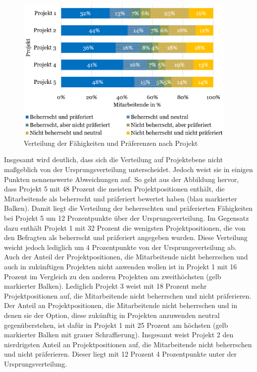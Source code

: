 \begin{figure}
    \centering
	\includegraphics[width=0.95\textwidth]{gfx/verteilung-f-p-nach-projekt.png}
	\caption[Verteilung der Fähigkeiten und Präferenzen nach Projekt]{Verteilung der Fähigkeiten und Präferenzen nach Projekt}
	\label{fig:ergebnisse:abb2}
\end{figure}

Insgesamt wird deutlich, dass sich die Verteilung auf Projektebene nicht maßgeblich von der Ursprungsverteilung unterscheidet.
Jedoch weist sie in einigen Punkten nennenswerte Abweichungen auf.
So geht aus der Abbildung hervor, dass Projekt 5 mit 48 Prozent die meisten Projektpositionen enthält, die Mitarbeitende als beherrscht und präferiert bewertet haben (blau markierter Balken).
Damit liegt die Verteilung der beherrschten und präferierten Fähigkeiten bei Projekt 5 um  12 Prozentpunkte über der Ursprungsverteilung.
Im Gegensatz dazu enthält Projekt 1 mit 32 Prozent die wenigsten Projektpositionen, die von den Befragten als beherrscht und präferiert angegeben wurden.
Diese Verteilung weicht jedoch lediglich um 4 Prozentpunkte von der Ursprungsverteilung ab.
Auch der Anteil der Projektpositionen, die Mitarbeitende nicht beherrschen und auch in zukünftigen Projekten nicht anwenden wollen ist in Projekt 1 mit 16 Prozent im Vergleich zu den anderen Projekten am zweithöchsten (gelb markierter Balken).
Lediglich Projekt 3 weist mit 18 Prozent mehr Projektpositionen auf, die Mitarbeitende nicht beherrschen und nicht präferieren.
Der Anteil an Projektpositionen, die Mitarbeitende nicht beherrschen und in denen sie der Option, diese zukünftig in Projekten anzuwenden neutral gegenüberstehen, ist dafür in Projekt 1 mit 25 Prozent am höchsten (gelb markierter Balken mit grauer Schraffierung).
Insgesamt weist Projekt 2 den nierdrigsten Anteil an Projektpositionen auf, die Mitarbeitende nicht beherrschen und nicht präferieren.
Dieser liegt mit 12 Prozent 4 Prozentpunkte unter der Ursprungsverteilung.

